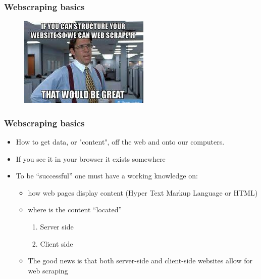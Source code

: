 
\begin{frame}
\frametitle{Webscraping basics}

\begin{figure}[H] \centering
  \centering
  \includegraphics[scale=0.75]{figures/webscrape_it.jpg}
  \\
  \tiny
\end{figure}

\end{frame}

\begin{frame}
\frametitle{Webscraping basics}

\begin{itemize}
  \item How to get data, or "content", off the web and onto our computers.
  \bigskip
  \item If you see it in your browser it exists somewhere
  \bigskip
  \item To be ``successful'' one must have a working knowledge on:
  \begin{itemize}
  \item how web pages display content (Hyper Text Markup Language or HTML)
  \medskip
  \item where is the content ``located''


    \begin{enumerate}
    \item Server side
    \medskip
    \item Client side
    \medskip

    \end{enumerate}
    \item The good news is that both server-side and client-side websites allow for web scraping
   \end{itemize}
\end{itemize}





\end{frame}


